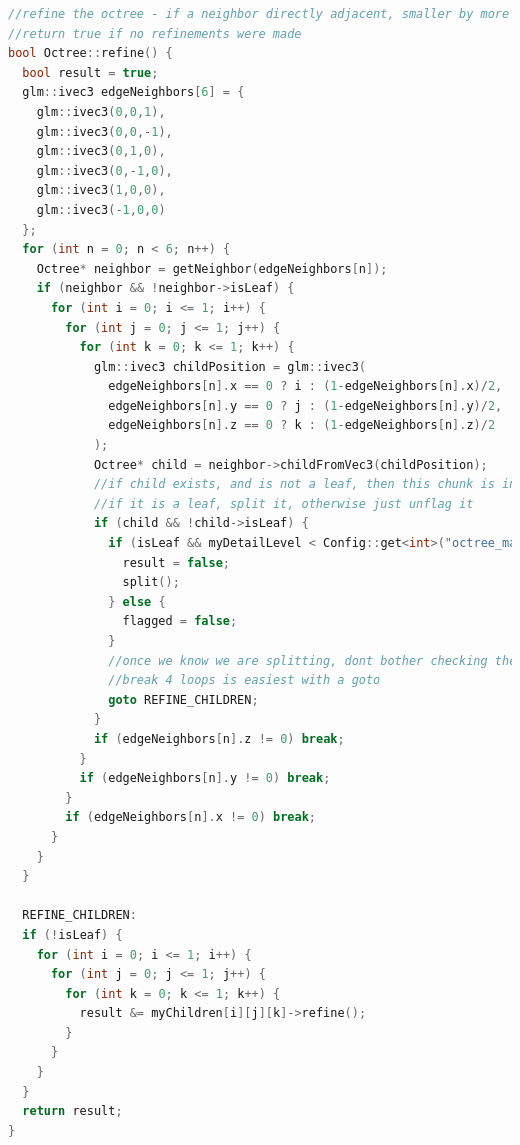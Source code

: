 \documentclass[11pt]{article}
\begin{document}
\begin{enumerate}
  \begin{lstlisting}[language=C++,label={refinephase},caption={The second stage in the octree refinement process, \texttt{refine}. The array \texttt{edgeNeighbors} corresponds to the relative positions of the neighboring chunks, at the same level of detail, and the variable \texttt{childPosition} gives the position of the child to check in each neighbor. The flow of this code is designed such that exactly the 4 children of the neighboring chunk that touch this chunk are checked.}] 
//refine the octree - if a neighbor directly adjacent, smaller by more than one exists, split this
//return true if no refinements were made
bool Octree::refine() {
  bool result = true;
  glm::ivec3 edgeNeighbors[6] = {
    glm::ivec3(0,0,1),
    glm::ivec3(0,0,-1),
    glm::ivec3(0,1,0),
    glm::ivec3(0,-1,0),
    glm::ivec3(1,0,0),
    glm::ivec3(-1,0,0)
  };
  for (int n = 0; n < 6; n++) {
    Octree* neighbor = getNeighbor(edgeNeighbors[n]);
    if (neighbor && !neighbor->isLeaf) {
      for (int i = 0; i <= 1; i++) {
        for (int j = 0; j <= 1; j++) {
          for (int k = 0; k <= 1; k++) {
            glm::ivec3 childPosition = glm::ivec3(
              edgeNeighbors[n].x == 0 ? i : (1-edgeNeighbors[n].x)/2,
              edgeNeighbors[n].y == 0 ? j : (1-edgeNeighbors[n].y)/2,
              edgeNeighbors[n].z == 0 ? k : (1-edgeNeighbors[n].z)/2
            );
            Octree* child = neighbor->childFromVec3(childPosition);
            //if child exists, and is not a leaf, then this chunk is inconsistent
            //if it is a leaf, split it, otherwise just unflag it
            if (child && !child->isLeaf) {
              if (isLeaf && myDetailLevel < Config::get<int>("octree_max_depth")) {
                result = false;
                split();
              } else {
                flagged = false;
              }
              //once we know we are splitting, dont bother checking the other options
              //break 4 loops is easiest with a goto
              goto REFINE_CHILDREN;
            }
            if (edgeNeighbors[n].z != 0) break;
          }
          if (edgeNeighbors[n].y != 0) break;
        }
        if (edgeNeighbors[n].x != 0) break;
      }
    }
  }
  
  REFINE_CHILDREN:
  if (!isLeaf) {
    for (int i = 0; i <= 1; i++) {
      for (int j = 0; j <= 1; j++) {
        for (int k = 0; k <= 1; k++) {
          result &= myChildren[i][j][k]->refine();
        }
      }
    }
  }
  return result;
}
  \end{lstlisting}


\end{enumerate}
\end{document}
